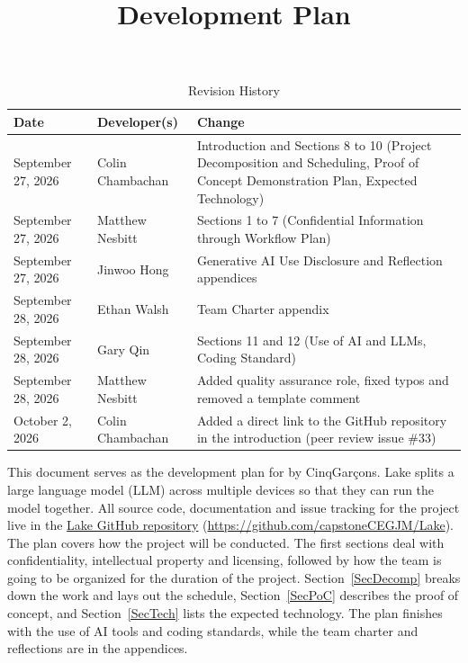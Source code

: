 \documentclass{article}
\title{Development Plan\\\progname}
\author{\authname}
\date{}
\begin{document}
\maketitle

\begin{table}[hp]
\caption{Revision History} \label{TblRevisionHistory}
\begin{tabularx}{\textwidth}{llX}
\toprule
\textbf{Date} & \textbf{Developer(s)} & \textbf{Change}\\
\midrule
September 27, 2026 & Colin Chambachan & Introduction and Sections 8 to 10
  (Project Decomposition and Scheduling, Proof of Concept Demonstration Plan,
  Expected Technology)\\
September 27, 2026 & Matthew Nesbitt & Sections 1 to 7 (Confidential
  Information through Workflow Plan)\\
September 27, 2026 & Jinwoo Hong & Generative AI Use Disclosure and
  Reflection appendices\\
September 28, 2026 & Ethan Walsh & Team Charter appendix\\
September 28, 2026 & Gary Qin & Sections 11 and 12 (Use of AI and LLMs,
  Coding Standard)\\
September 28, 2026 & Matthew Nesbitt & Added quality assurance role, fixed
  typos and removed a template comment\\
October 2, 2026 & Colin Chambachan & Added a direct link to the GitHub
  repository in the introduction (peer review issue \#33)\\
\bottomrule
\end{tabularx}
\end{table}

\newpage{}

This document serves as the development plan for \progname{} by CinqGarçons.
Lake splits a large language model (LLM) across multiple devices so that they
can run the model together. All source code, documentation and issue tracking
for the project live in the
\href{https://github.com/capstoneCEGJM/Lake}{Lake GitHub repository}
(\url{https://github.com/capstoneCEGJM/Lake}). The plan covers how the project
will be conducted.
The first sections deal with confidentiality, intellectual property and
licensing, followed by how the team is going to be organized for the duration
of the project. Section~\ref{SecDecomp} breaks down
the work and lays out the schedule, Section~\ref{SecPoC} describes the proof of
concept, and Section~\ref{SecTech} lists the expected technology. The plan
finishes with the use of AI tools and coding standards, while the team
charter and reflections are in the appendices. 
\end{document}
